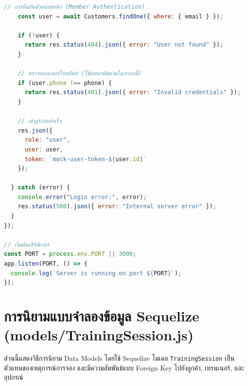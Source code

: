 \begin{lstlisting}[language=JavaScript, caption={การตั้งค่าเซิร์ฟเวอร์และการเริ่มต้นระบบ}, label={lst:server_js}]
    // การยืนยันตัวตนสมาชิก (Member Authentication)
    const user = await Customers.findOne({ where: { email } });
    
    if (!user) {
      return res.status(404).json({ error: "User not found" });
    }

    // ตรวจสอบเบอร์โทรศัพท์ (ใช้แทนรหัสผ่านในระบบนี้)
    if (user.phone !== phone) {
      return res.status(401).json({ error: "Invalid credentials" });
    }

    // เข้าสู่ระบบสำเร็จ
    res.json({
      role: "user",
      user: user,
      token: `mock-user-token-${user.id}`
    });

  } catch (error) {
    console.error("Login error:", error);
    res.status(500).json({ error: "Internal server error" });
  }
});

// เริ่มต้นเซิร์ฟเวอร์
const PORT = process.env.PORT || 3000;
app.listen(PORT, () => {
  console.log(`Server is running on port ${PORT}`);
});
\end{lstlisting}

\section{การนิยามแบบจำลองข้อมูล Sequelize (models/TrainingSession.js)}
ส่วนนี้แสดงวิธีการนิยาม Data Models โดยใช้ Sequelize โมเดล \texttt{TrainingSession} เป็นตัวแทนของเหตุการณ์การจอง และมีความสัมพันธ์แบบ Foreign Key ไปยังลูกค้า, เทรนเนอร์, และอุปกรณ์

